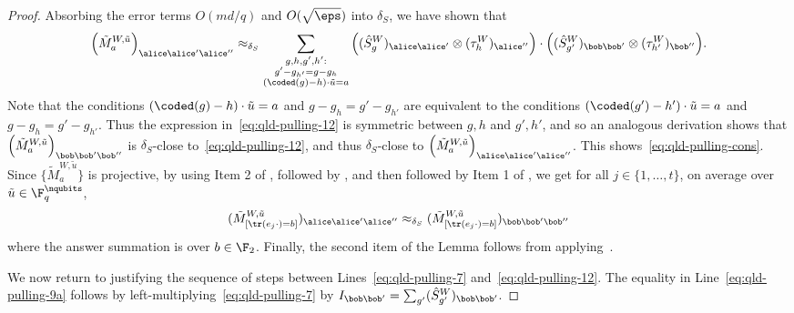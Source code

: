 \begin{proof}
		Absorbing the error terms $O(md/q)$ and $O(\sqrt{\eps})$ into $\delta_S$, we have shown that 
		\[
		\Big ( \tilde{M}^{W,\tilde{u}}_a \Big)_{\alice \alice' \alice''} \approx_{\delta_S} \sum_{\substack{g,h,g',h': \\ g' - g_{h'} = g -g_h \\ (\coded(g)-h)\cdot \tilde{u} = a}} \Big((\hat{S}^W_g)_{\alice \alice'} \otimes (\tau_h^W)_{\alice''} \Big) \cdot \Big( (\hat{S}^W_{g'})_{\bob \bob'} \otimes (\tau_{h'}^W)_{\bob''} \Big).
		\]
		Note that the conditions $(\coded(g)-h)\cdot \tilde{u} = a$ and $g - g_h = g' - g_{h'}$ are equivalent to the conditions $(\coded(g') - h') \cdot \tilde{u} = a$ and $g - g_h = g' - g_{h'}$. Thus the expression in~\eqref{eq:qld-pulling-12} is symmetric between $g,h$ and $g',h'$, and so an analogous derivation shows that $\Big ( \tilde{M}^{W,\tilde{u}}_a \Big)_{\bob \bob' \bob''}$ is $\delta_S$-close to~\eqref{eq:qld-pulling-12}, and thus $\delta_S$-close to $\Big ( \tilde{M}^{W,\tilde{u}}_a \Big)_{\alice \alice' \alice''}$. This shows~\eqref{eq:qld-pulling-cons}. Since $\{ \tilde{M}^{W,\tilde{u}}_a \}$ is projective, by using Item 2 of , followed by , and then followed by Item 1 of , we get for all $j \in \{1,\ldots,t\}$, on average over $\tilde{u} \in \F_q^\nqubits$,
\[
	(\tilde{M}^{W,\tilde{u}}_{[\tr(e_j \cdot) = b]})_{\alice \alice' \alice''} \approx_{\delta_S} ( \tilde{M}^{W,\tilde{u}}_{[\tr(e_j \cdot) = b]})_{\bob \bob' \bob''}
\]
where the answer summation is over $b \in \F_2$. Finally, the second item of the Lemma follows from applying~.

		We now return to justifying the sequence of steps between Lines~\eqref{eq:qld-pulling-7} and~\eqref{eq:qld-pulling-12}. The equality in Line~\eqref{eq:qld-pulling-9a} follows by left-multiplying~\eqref{eq:qld-pulling-7} by $I_{\bob \bob'} = \sum_{g'} (\hat{S}^W_{g'})_{\bob \bob'}$. 
		

\end{proof}
